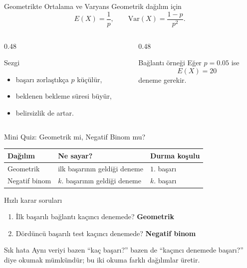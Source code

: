 \documentclass[light]{lutbeamer}
\begin{document}
\begin{frame}{Geometrikte Ortalama ve Varyans}
    \small
    Geometrik dağılım için
    \[
    E(X)=\frac{1}{p}, \qquad \mathrm{Var}(X)=\frac{1-p}{p^2}.
    \]

    \begin{columns}[T]
        \begin{column}{0.48\textwidth}
            \begin{block}{Sezgi}
                \begin{itemize}
                    \item başarı zorlaştıkça \(p\) küçülür,
                    \item beklenen bekleme süresi büyür,
                    \item belirsizlik de artar.
                \end{itemize}
            \end{block}
        \end{column}
        \begin{column}{0.48\textwidth}
            \begin{exampleblock}{Bağlantı örneği}
                Eğer \(p=0.05\) ise
                \[
                E(X)=20
                \]
                deneme gerekir.
            \end{exampleblock}
        \end{column}
    \end{columns}
\end{frame}

\begin{frame}{Mini Quiz: Geometrik mi, Negatif Binom mu?}
    \small
    \begin{center}
        \begin{tabular}{@{}lll@{}}
            \toprule
            \textbf{Dağılım} & \textbf{Ne sayar?} & \textbf{Durma koşulu} \\ \midrule
            Geometrik & ilk başarının geldiği deneme & \(1\). başarı \\
            Negatif binom & \(k\). başarının geldiği deneme & \(k\). başarı \\ \bottomrule
        \end{tabular}
    \end{center}

    \begin{exampleblock}{Hızlı karar soruları}
        \begin{enumerate}
            \item İlk başarılı bağlantı kaçıncı denemede? \textbf{Geometrik}
            \item Dördüncü başarılı test kaçıncı denemede? \textbf{Negatif binom}
        \end{enumerate}
    \end{exampleblock}

    \begin{alertblock}{Sık hata}
        Aynı veriyi bazen ``kaç başarı?'' bazen de ``kaçıncı denemede başarı?'' diye okumak mümkündür; bu iki okuma farklı dağılımlar üretir.
    \end{alertblock}
\end{frame}
\end{document}
